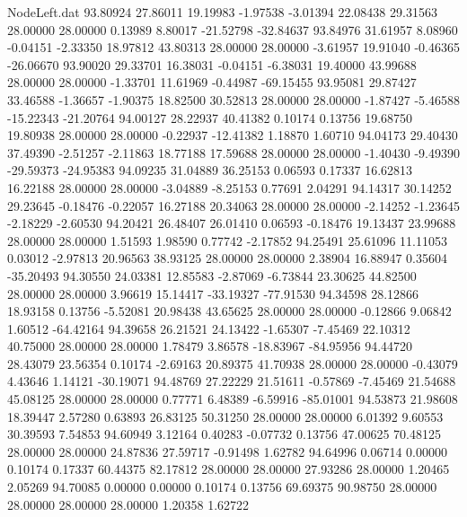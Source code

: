 \begin{filecontents}{NodeLeft.dat}
  93.80924   27.86011   19.19983    -1.97538   -3.01394   22.08438   29.31563   28.00000   28.00000    0.13989    8.80017  -21.52798  -32.84637
  93.84976   31.61957    8.08960    -0.04151   -2.33350   18.97812   43.80313   28.00000   28.00000   -3.61957   19.91040   -0.46365  -26.06670
  93.90020   29.33701   16.38031    -0.04151   -6.38031   19.40000   43.99688   28.00000   28.00000   -1.33701   11.61969   -0.44987  -69.15455
  93.95081   29.87427   33.46588    -1.36657   -1.90375   18.82500   30.52813   28.00000   28.00000   -1.87427   -5.46588  -15.22343  -21.20764
  94.00127   28.22937   40.41382     0.10174    0.13756   19.68750   19.80938   28.00000   28.00000   -0.22937  -12.41382    1.18870    1.60710
  94.04173   29.40430   37.49390    -2.51257   -2.11863   18.77188   17.59688   28.00000   28.00000   -1.40430   -9.49390  -29.59373  -24.95383
  94.09235   31.04889   36.25153     0.06593    0.17337   16.62813   16.22188   28.00000   28.00000   -3.04889   -8.25153    0.77691    2.04291
  94.14317   30.14252   29.23645    -0.18476   -0.22057   16.27188   20.34063   28.00000   28.00000   -2.14252   -1.23645   -2.18229   -2.60530
  94.20421   26.48407   26.01410     0.06593   -0.18476   19.13437   23.99688   28.00000   28.00000    1.51593    1.98590    0.77742   -2.17852
  94.25491   25.61096   11.11053     0.03012   -2.97813   20.96563   38.93125   28.00000   28.00000    2.38904   16.88947    0.35604  -35.20493
  94.30550   24.03381   12.85583    -2.87069   -6.73844   23.30625   44.82500   28.00000   28.00000    3.96619   15.14417  -33.19327  -77.91530
  94.34598   28.12866   18.93158     0.13756   -5.52081   20.98438   43.65625   28.00000   28.00000   -0.12866    9.06842    1.60512  -64.42164
  94.39658   26.21521   24.13422    -1.65307   -7.45469   22.10312   40.75000   28.00000   28.00000    1.78479    3.86578  -18.83967  -84.95956
  94.44720   28.43079   23.56354     0.10174   -2.69163   20.89375   41.70938   28.00000   28.00000   -0.43079    4.43646    1.14121  -30.19071
  94.48769   27.22229   21.51611    -0.57869   -7.45469   21.54688   45.08125   28.00000   28.00000    0.77771    6.48389   -6.59916  -85.01001
  94.53873   21.98608   18.39447     2.57280    0.63893   26.83125   50.31250   28.00000   28.00000    6.01392    9.60553   30.39593    7.54853
  94.60949    3.12164    0.40283    -0.07732    0.13756   47.00625   70.48125   28.00000   28.00000   24.87836   27.59717   -0.91498    1.62782
  94.64996    0.06714    0.00000     0.10174    0.17337   60.44375   82.17812   28.00000   28.00000   27.93286   28.00000    1.20465    2.05269
  94.70085    0.00000    0.00000     0.10174    0.13756   69.69375   90.98750   28.00000   28.00000   28.00000   28.00000    1.20358    1.62722

\end{filecontents}
